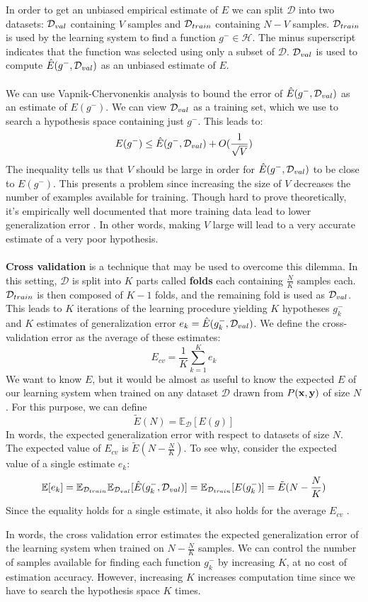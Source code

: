 In order to get an unbiased empirical estimate of $E$ we can split $\mathcal{D}$ into two datasets: $\mathcal{D}_{val}$ containing $V$ samples and $\mathcal{D}_{train}$ containing $N - V$ samples. $\mathcal{D}_{train}$ is used by the learning system to find a function $g^- \in \mathcal{H}$. The minus superscript indicates that the function was selected using only a subset of $\mathcal{D}$. $\mathcal{D}_{val}$ is used to compute $\hat{E}(g^-, \mathcal{D}_{val})$ as an unbiased estimate of $E$.
\\\\
We can use Vapnik-Chervonenkis analysis to bound the error of $\hat{E}(g^-, \mathcal{D}_{val})$ as an estimate of $E(g^-)$. We can view $\mathcal{D}_{val}$ as a training set, which we use to search a hypothesis space containing just $g^-$. This leads to:
$$
E(g^-) \leq \hat{E}(g^-, \mathcal{D}_{val}) + O(\frac{1}{\sqrt{V}})
$$
The inequality tells us that $V$ should be large in order for $\hat{E}(g^-, \mathcal{D}_{val})$ to be close to $E(g^-)$. This presents a problem since increasing the size of $V$ decreases the number of examples available for training. Though hard to prove theoretically, it's empirically well documented that more training data lead to lower generalization error \citep{yaser12}. In other words, making $V$ large will lead to a very accurate estimate of a very poor hypothesis.
\\\\
\textbf{Cross validation} is a technique that may be used to overcome this dilemma. In this setting, $\mathcal{D}$ is split into $K$ parts called \textbf{folds} each containing $\frac{N}{K}$ samples each. $\mathcal{D}_{train}$ is then composed of $K - 1$ folds, and the remaining fold is used as $\mathcal{D}_{val}$. This leads to $K$ iterations of the learning procedure yielding $K$ hypotheses $g^-_k$ and $K$ estimates of generalization error $e_k = \hat{E}(g^-_k, \mathcal{D}_{val})$. We define the cross-validation error as the average of these estimates:
$$
E_{cv} = \frac{1}{K}\sum\limits_{k=1}^K e_k
$$
We want to know $E$, but it would be almost as useful to know the expected $E$ of our learning system when trained on any dataset $\mathcal{D}$ drawn from $P(\mathbf{x}, \mathbf{y})$ of size $N$. For this purpose, we can define 
$$
\tilde{E}(N) = \mathbb{E}_{\mathcal{D}}[E(g)]
$$
In words, the expected generalization error with respect to datasets of size $N$. The expected value of $E_{cv}$ is $\tilde{E}(N - \frac{N}{K})$. To see why, consider the expected value of a single estimate $e_k$:
$$
\mathbb{E}[e_k] = \mathbb{E}_{\mathcal{D}_{train}}\mathbb{E}_{\mathcal{D}_{val}}[\hat{E}(g^-_k, \mathcal{D}_{val})] = \mathbb{E}_{\mathcal{D}_{train}}[E(g^-_k)] = \tilde{E}(N - \frac{N}{K})
$$
Since the equality holds for a single estimate, it also holds for the average $E_{cv}$ \citep{yaser12}.

In words, the cross validation error estimates the expected generalization error of the learning system when trained on $N - \frac{N}{K}$ samples. We can control the number of samples available for finding each function $g^-_k$ by increasing $K$, at no cost of estimation accuracy. However, increasing $K$ increases computation time since we have to search the hypothesis space $K$ times.